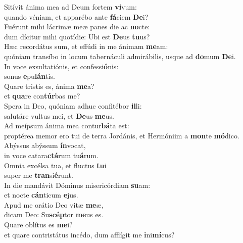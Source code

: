 \evenverse Sitívit ánima mea ad Deum fortem \textbf{vi}vum:~\*\\
\evenverse quando véniam, et apparébo ante \textbf{fá}ciem \textbf{De}i?\\
\oddverse Fuérunt mihi lácrimæ meæ panes die ac \textbf{no}cte:~\*\\
\oddverse dum dícitur mihi quotídie: Ubi est \textbf{De}us \textbf{tu}us?\\
\evenverse Hæc recordátus sum, et effúdi in me ánimam \textbf{me}am:~\*\\
\evenverse quóniam transíbo in locum tabernáculi admirábilis, usque ad \textbf{do}mum \textbf{De}i.\\
\oddverse In voce exsultatiónis, et confessi\textbf{ó}nis:~\*\\
\oddverse sonus \textbf{e}pu\textbf{lán}tis.\\
\evenverse Quare tristis es, ánima \textbf{me}a?~\*\\
\evenverse et \textbf{qua}re con\textbf{túr}bas me?\\
\oddverse Spera in Deo, quóniam adhuc confitébor \textbf{il}li:~\*\\
\oddverse salutáre vultus mei, et \textbf{De}us \textbf{me}us.\\
\evenverse Ad meípsum ánima mea contur\textbf{bá}ta est:~\*\\
\evenverse proptérea memor ero tui de terra Jordánis, et Hermóniim a \textbf{mon}te \textbf{mó}dico.\\
\oddverse Abýssus abýssum \textbf{ín}vocat,~\*\\
\oddverse in voce catara\textbf{ctá}rum tu\textbf{á}rum.\\
\evenverse Omnia excélsa tua, et fluctus \textbf{tu}i~\*\\
\evenverse super me \textbf{tran}si\textbf{é}runt.\\
\oddverse In die mandávit Dóminus misericórdiam \textbf{su}am:~\*\\
\oddverse et nocte \textbf{cán}ticum \textbf{e}jus.\\
\evenverse Apud me orátio Deo vitæ \textbf{me}æ,~\*\\
\evenverse dicam Deo: Su\textbf{scép}tor \textbf{me}us es.\\
\oddverse Quare oblítus es \textbf{me}i?~\*\\
\oddverse et quare contristátus incédo, dum afflígit me \textbf{i}ni\textbf{mí}cus?\\
